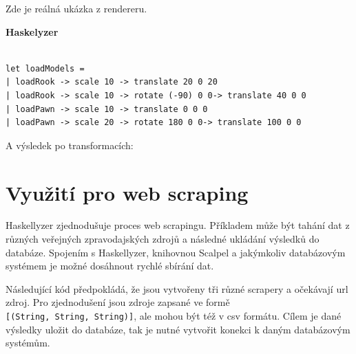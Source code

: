 \documentclass[male,czech]{kithesis}
\newcommand{\haskellInline}[1]{\colorbox{gray!10}{\texttt{#1}}}
\begin{document}
Zde je reálná ukázka z rendereru.

\textbf{Haskelyzer}
\begin{verbatim}

let loadModels = 
| loadRook -> scale 10 -> translate 20 0 20
| loadRook -> scale 10 -> rotate (-90) 0 0-> translate 40 0 0
| loadPawn -> scale 10 -> translate 0 0 0
| loadPawn -> scale 20 -> rotate 180 0 0-> translate 100 0 0

\end{verbatim}

A výsledek po transformacích:

{\begin{center}
\end{center}
}

\section{Využití pro web scraping}

Haskellyzer zjednodušuje proces web scrapingu. 
Příkladem může být tahání dat z různých veřejných zpravodajských zdrojů a 
následné ukládání výsledků do databáze. 
Spojením s Haskellyzer, knihovnou Scalpel a 
jakýmkoliv databázovým systémem je možné dosáhnout rychlé sbírání dat.

Následující kód předpokládá, 
že jsou vytvořeny tři různé scrapery a 
očekávají url zdroj.
Pro zjednodušení jsou zdroje zapsané ve formě \\ 
\haskellInline{[(String, String, String)]}, 
ale mohou být též v csv formátu.
Cílem je dané výsledky uložit do databáze,
tak je nutné vytvořit konekci k daným databázovým systémům. 
\end{document}
